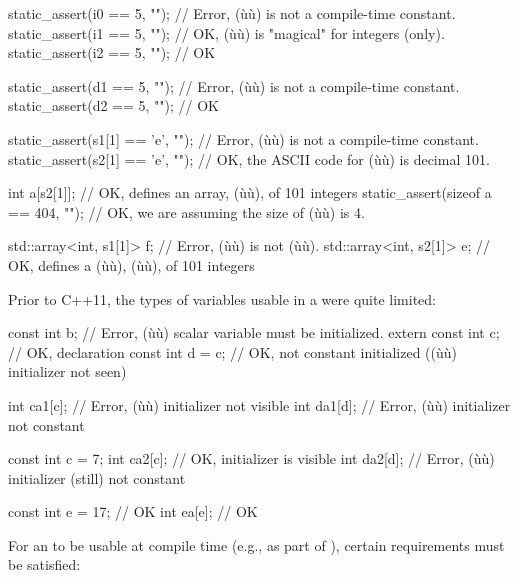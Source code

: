 \begin{emcppslisting}[emcppsbatch=e1]
static_assert(i0 == 5, "");         // Error, (ù{}ù) is not a compile-time constant.
static_assert(i1 == 5, "");         // OK, (ù{}ù) is "magical" for integers (only).
static_assert(i2 == 5, "");         // OK

static_assert(d1 == 5, "");         // Error, (ù{}ù) is not a compile-time constant.
static_assert(d2 == 5, "");         // OK

static_assert(s1[1] == 'e', "");    // Error, (ù{}ù) is not a compile-time constant.
static_assert(s2[1] == 'e', "");    // OK, the ASCII code for (ù{}ù) is decimal 101.

int a[s2[1]];                       // OK, defines an array, (ù{}ù), of 101 integers
static_assert(sizeof a == 404, ""); // OK, we are assuming the size of (ù{}ù) is 4.

std::array<int, s1[1]> f;           // Error, (ù{}ù) is not (ù{}ù).
std::array<int, s2[1]> e;           // OK, defines a (ù{}ù), (ù{}ù), of 101 integers
\end{emcppslisting}
    
\noindent Prior to C++11, the types of variables usable in a  were quite limited:

\begin{emcppslisting}
const int b;         // Error, (ù{}ù) scalar variable must be initialized.
extern const int c;  // OK, declaration
const int d = c;     // OK, not constant initialized ((ù{}ù) initializer not seen)

int ca1[c];          // Error, (ù{}ù) initializer not visible
int da1[d];          // Error, (ù{}ù) initializer not constant

const int c = 7;
int ca2[c];          // OK, initializer is visible
int da2[d];          // Error, (ù{}ù) initializer (still) not constant

const int e = 17;    // OK
int ea[e];           // OK
\end{emcppslisting}
    
\noindent For an  to be usable at compile time (e.g., as
part of ), certain requirements must be
satisfied:

